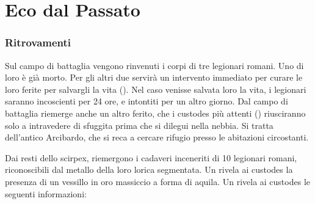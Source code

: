 \documentclass[11.5pt,twocolumn]{article}
\begin{document}
\part{Eco dal Passato}
%
\section{Ritrovamenti}

Sul campo di battaglia vengono rinvenuti i corpi di tre legionari romani.
Uno di loro \`{e} gi\`{a} morto. Per gli altri due servir\`{a} un intervento immediato per curare le loro ferite per salvargli la vita ().
Nel caso venisse salvata loro la vita, i legionari saranno incoscienti per 24 ore, e intontiti per un altro giorno.
Dal campo di battaglia riemerge anche un altro ferito, che i custodes pi\`{u} attenti () riusciranno solo a intravedere di sfuggita prima che si dilegui nella nebbia.
Si tratta dell'antico Arcibardo, che si reca a cercare rifugio presso le abitazioni circostanti.


Dai resti dello scirpex, riemergono i cadaveri inceneriti di 10 legionari romani, riconoscibili dal metallo della loro lorica segmentata.
Un  rivela ai custodes la presenza di un vessillo in oro massiccio a forma di aquila.
%
Un  rivela ai custodes le seguenti informazioni:
\end{document}

